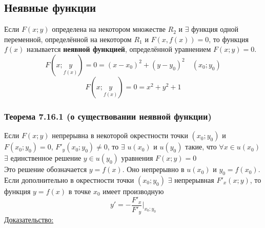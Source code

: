 \documentclass[12pt]{article}
\begin{document}
    \subsection{Неявные функции}\noindent
    Если $F(x;y)$ определена на некотором множестве $R_2$ и $\exists$ функция одной переменной, определённой на некотором $R_1$ и $F(x, f(x)) = 0$, то функция $f(x)$ называется \textbf{неявной функцией}, определённой уравнением $F(x;y) = 0$.
    \[ F(x;\underset{f(x)}{y}) = 0 = (x-x_0)^2 + (y-y_0)^2 \quad (x_0; y_0) \]
    \[ F(x;\underset{f(x)}{y}) = 0 = x^2 + y^2 + 1 \]
    \subsubsection*{Теорема 7.16.1 (о существовании неявной функции)}\label{th:7.16.1}
    Если $F(x;y)$ непрерывна в некоторой окрестности точки $(x_0; y_0)$ и $F(x_0; y_0) = 0$, $F'_y(x_0; y_0) \ne 0$, то $\exists$ $u(x_0)$ и $u(y_0)$ такие, что $\forall x \in u(x_0)$ $\exists$ единственное решение $y \in u(y_0)$ уравнения $F(x;y) = 0$\\
    Это решение обозначается $y = f(x)$. Оно непрерывно в $u(x_0)$ и $y_0 = f(x_0)$.\\
    Если дополнительно в окрестности точки $(x_0; y_0)$ $\exists$ непрерывная $F'_x(x; y)$, то функция $y = f(x)$ в точке $x_0$ имеет производную
    \[ \boxed{ y' = -\frac{F'_x}{F'_y} \Big|_{x_0; y_0} } \]
    \underline{Доказательство:}
\end{document}
